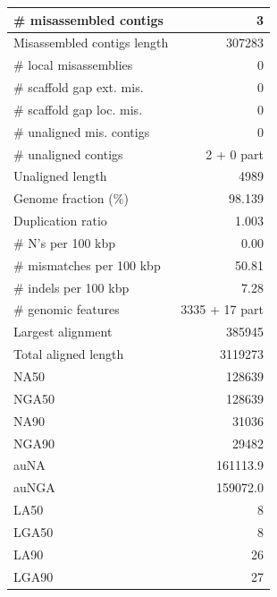 \documentclass[12pt,a4paper]{article}
\begin{document}
\begin{table}[ht]
\begin{center}
\begin{tabular}{|l*{1}{|r}|}
\# misassembled contigs & 3 \\ \hline
Misassembled contigs length & 307283 \\ \hline
\# local misassemblies & 0 \\ \hline
\# scaffold gap ext. mis. & 0 \\ \hline
\# scaffold gap loc. mis. & 0 \\ \hline
\# unaligned mis. contigs & 0 \\ \hline
\# unaligned contigs & 2 + 0 part \\ \hline
Unaligned length & 4989 \\ \hline
Genome fraction (\%) & 98.139 \\ \hline
Duplication ratio & 1.003 \\ \hline
\# N's per 100 kbp & 0.00 \\ \hline
\# mismatches per 100 kbp & 50.81 \\ \hline
\# indels per 100 kbp & 7.28 \\ \hline
\# genomic features & 3335 + 17 part \\ \hline
Largest alignment & 385945 \\ \hline
Total aligned length & 3119273 \\ \hline
NA50 & 128639 \\ \hline
NGA50 & 128639 \\ \hline
NA90 & 31036 \\ \hline
NGA90 & 29482 \\ \hline
auNA & 161113.9 \\ \hline
auNGA & 159072.0 \\ \hline
LA50 & 8 \\ \hline
LGA50 & 8 \\ \hline
LA90 & 26 \\ \hline
LGA90 & 27 \\ \hline
\end{tabular}
\end{center}
\end{table}
\end{document}
